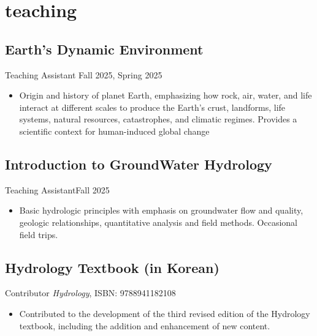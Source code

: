 \section{teaching}
\subsection{Earth's Dynamic Environment}{Teaching Assistant} {Fall 2025, Spring 2025} 
\begin{itemize}
    \item Origin and history of planet Earth, emphasizing how rock, air, water, and life interact at different scales to produce the Earth's crust, landforms, life systems, natural resources, catastrophes, and climatic regimes. Provides a scientific context for human-induced global change
\end{itemize}
\subsection{Introduction to GroundWater Hydrology}{Teaching Assistant}{Fall 2025}
\begin{itemize}
    \item Basic hydrologic principles with emphasis on groundwater flow and quality, geologic relationships, quantitative analysis and field methods. Occasional field trips.
\end{itemize}

\subsection{Hydrology Textbook (in Korean)}{Contributor}
\textit{Hydrology}, ISBN: 9788941182108
\begin{itemize}
    \item Contributed to the development of the third revised edition of the Hydrology textbook, including the addition and enhancement of new content.
\end{itemize}